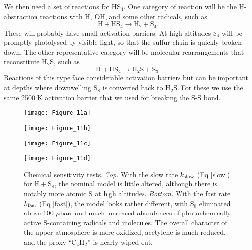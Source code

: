 \documentclass[preprint]{aastex}
\newcounter{reaction}
\begin{document}
We then need a set of reactions for HS$_4$.
One category of reaction will be the H-abstraction reactions with H, OH, and some other radicals, such as
\begin{equation}
\mathrm{H} + \mathrm{HS}_4 \rightarrow \mathrm{H}_2 + \mathrm{S}_4 .
\end{equation}
These will probably have small activation barriers.
At high altitudes S$_4$ will be promptly photolysed by visible light, so that the sulfur chain is quickly broken down. 
 The other representative category will be molecular rearrangements that reconstitute H$_2$S, such as
 \begin{equation}
\mathrm{H} + \mathrm{HS}_4 \rightarrow \mathrm{H}_2\mathrm{S} + \mathrm{S}_3 .
\end{equation}
 Reactions of this type face considerable activation barriers but can be important at depths
 where downwelling S$_8$ is converted back to H$_2$S.
 For these we use the same 2500 K activation barrier that we used for breaking the S-S bond. 
   
\begin{figure}[!htb]
 \centering
 \begin{minipage}[c]{0.49\textwidth}
   \centering
  \texttt{[image: Figure\_11a]} 
 \end{minipage}
 \begin{minipage}[c]{0.49\textwidth}
   \centering
 \texttt{[image: Figure\_11b]} 
 \end{minipage}
 \centering
 \begin{minipage}[c]{0.49\textwidth}
   \centering
 \texttt{[image: Figure\_11c]} 
 \end{minipage}
 \begin{minipage}[c]{0.49\textwidth}
   \centering
 \texttt{[image: Figure\_11d]} 
 \end{minipage}
 \caption{\small Chemical sensitivity tests.  {\it Top.} With the slow rate $k_{\rm slow}$ (Eq \ref{slow}) for 
$\mathrm{H} + \mathrm{S}_8$, the nominal model is little altered, although there is notably more atomic S at high altitudes.
  {\it Bottom.} With the fast rate $k_{\rm fast}$ (Eq \ref{fast}), the model looks rather different, with S$_8$ eliminated above 100 $\mu$bars
  and much increased abundances of photochemically active S-containing radicals and molecules.  The overall character
  of the upper atmosphere is more oxidized, acetylene is much reduced, and the proxy ``C$_4$H$_2$'' is nearly wiped out. }
\label{4Sensitivity}
\end{figure}
\end{document}
